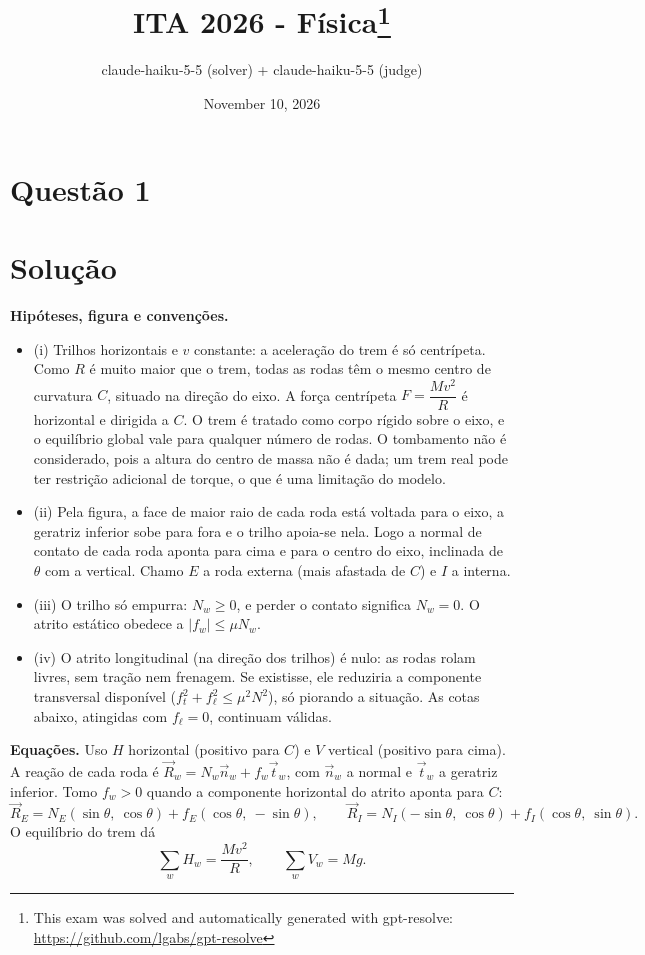 \documentclass{article}%
\title{ITA 2026 - Física\thanks{This exam was solved and automatically generated with gpt-resolve: \url{https://github.com/lgabs/gpt-resolve}}}%
\author{claude{-}haiku{-}5{-}5 (solver) + claude{-}haiku{-}5{-}5 (judge)}%
\date{November 10, 2026}%
\begin{document}
%
\normalsize%
\maketitle%
\section*{Questão 1}

\section*{Solução}

\textbf{Hipóteses, figura e convenções.}
\begin{itemize}
\item (i) Trilhos horizontais e $v$ constante: a aceleração do trem é só centrípeta. Como $R$ é muito maior que o trem, todas as rodas têm o mesmo centro de curvatura $C$, situado na direção do eixo. A força centrípeta $F=\dfrac{Mv^2}{R}$ é horizontal e dirigida a $C$. O trem é tratado como corpo rígido sobre o eixo, e o equilíbrio global vale para qualquer número de rodas. O tombamento não é considerado, pois a altura do centro de massa não é dada; um trem real pode ter restrição adicional de torque, o que é uma limitação do modelo.
\item (ii) Pela figura, a face de maior raio de cada roda está voltada para o eixo, a geratriz inferior sobe para fora e o trilho apoia-se nela. Logo a normal de contato de cada roda aponta para cima e para o centro do eixo, inclinada de $\theta$ com a vertical. Chamo $E$ a roda externa (mais afastada de $C$) e $I$ a interna.
\item (iii) O trilho só empurra: $N_w\ge 0$, e perder o contato significa $N_w=0$. O atrito estático obedece a $|f_w|\le\mu N_w$.
\item (iv) O atrito longitudinal (na direção dos trilhos) é nulo: as rodas rolam livres, sem tração nem frenagem. Se existisse, ele reduziria a componente transversal disponível ($f_t^2+f_\ell^2\le\mu^2N^2$), só piorando a situação. As cotas abaixo, atingidas com $f_\ell=0$, continuam válidas.
\end{itemize}

\textbf{Equações.} Uso $H$ horizontal (positivo para $C$) e $V$ vertical (positivo para cima). A reação de cada roda é $\vec R_w=N_w\vec n_w+f_w\vec t_w$, com $\vec n_w$ a normal e $\vec t_w$ a geratriz inferior. Tomo $f_w>0$ quando a componente horizontal do atrito aponta para $C$:
\[
\vec R_E=N_E(\sin\theta,\ \cos\theta)+f_E(\cos\theta,\ -\sin\theta),\qquad
\vec R_I=N_I(-\sin\theta,\ \cos\theta)+f_I(\cos\theta,\ \sin\theta).
\]
O equilíbrio do trem dá
\[
\sum_w H_w=\frac{Mv^2}{R},\qquad \sum_w V_w=Mg.
\]
\end{document}

